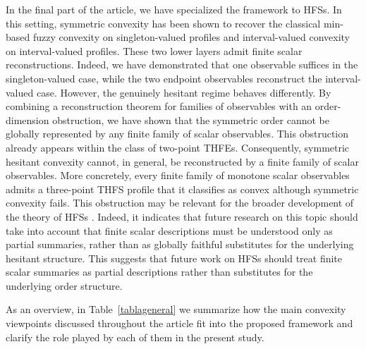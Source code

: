 \documentclass[11pt,a4paper]{article}
\begin{document}
\smallskip


In the final part of the article, we have specialized the framework to HFSs. In this setting, symmetric convexity has been shown to recover the classical min-based fuzzy convexity on singleton-valued profiles and interval-valued convexity on interval-valued profiles. These two lower layers admit finite scalar reconstructions. Indeed, we have demonstrated that one observable suffices in the singleton-valued case, while the two endpoint observables reconstruct the interval-valued case. However, the genuinely hesitant regime behaves differently. By combining a reconstruction theorem for families of observables with an order-dimension obstruction, we have shown that the symmetric order cannot be globally represented by any finite family of scalar observables. This obstruction already appears within the class of two-point THFEs. Consequently, symmetric hesitant convexity cannot, in general, be reconstructed by a finite family of scalar observables. More concretely, every finite family of monotone scalar observables admits a three-point THFS profile that it classifies as convex although symmetric convexity fails. This obstruction may be relevant for the broader development of the theory of HFSs \citep{Rodriguez2016Position}. Indeed, it indicates that future research on this topic should take into account that finite scalar descriptions must be understood only as partial summaries, rather than as globally faithful substitutes for the underlying hesitant structure. This suggests that future work on HFSs should treat finite scalar 
summaries as partial descriptions rather than substitutes for the 
underlying order structure.




\smallskip

As an overview, in Table~\ref{tablageneral} we summarize how the main convexity viewpoints discussed throughout the article fit into the proposed framework and clarify the role played by each of them in the present study.
\end{document}
